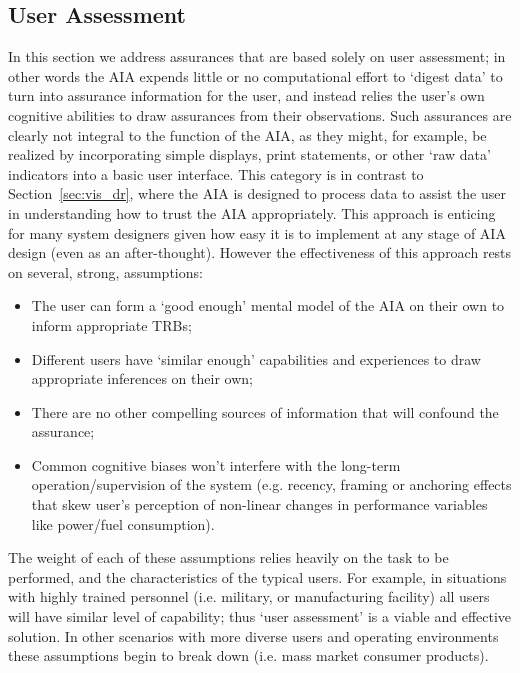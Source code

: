 \subsection{User Assessment} \label{sec:user_assessment}
In this section we address assurances that are based solely on user assessment; in other words the AIA expends little or no computational effort to `digest data' to turn into assurance information for the user, and instead relies the user's own cognitive abilities to draw assurances from their observations. Such assurances are clearly not integral to the function of the AIA, as they might, for example, be realized by incorporating simple displays, print statements, or other `raw data' indicators into a basic user interface. 
This category is in contrast to Section~\ref{sec:vis_dr}, where the AIA is designed to process data to assist the user in understanding how to trust the AIA appropriately. This approach is enticing for many system designers given how easy it is to implement at any stage of AIA design (even as an after-thought). However the effectiveness of this approach rests on several, strong, assumptions:

\begin{itemize}
    \item The user can form a `good enough' mental model of the AIA on their own to inform appropriate TRBs;
    \item Different users have `similar enough' capabilities and experiences to draw appropriate inferences on their own;
    \item There are no other compelling sources of information that will confound the assurance;
    \item Common cognitive biases won't interfere with the long-term operation/supervision of the system (e.g. recency, framing or anchoring effects that skew user's perception of non-linear changes in performance variables like power/fuel consumption). 
\end{itemize}

The weight of each of these assumptions relies heavily on the task to be performed, and the characteristics of the typical users. For example, in situations with highly trained personnel (i.e. military, or manufacturing facility) all users will have similar level of capability; thus `user assessment' is a viable and effective solution. 
In other scenarios with more diverse users and operating environments these assumptions begin to break down (i.e. mass market consumer products).

